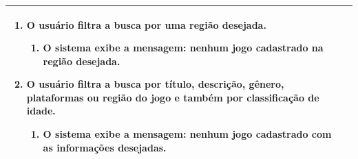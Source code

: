 \documentclass[a4paper,11pt]{article}
\begin{document}
\begin{table}[H]
\begin{tabularx}{\textwidth}{|l|X|}
\begin{enumerate}
			\item O usuário filtra a busca por uma região desejada.												\begin{enumerate}
			\item O sistema exibe a mensagem: nenhum jogo cadastrado na região desejada.
			\end{enumerate}
			
			\item O usuário filtra a busca por título, descrição, gênero, plataformas ou região do jogo e também por classificação de idade.
			\begin{enumerate}
			\item O sistema exibe a mensagem: nenhum jogo cadastrado com as informações desejadas.
			\end{enumerate}
			
			
			\end{enumerate} \\ \hline
			
			
		\end{tabularx}
\end{table}
\end{document}
